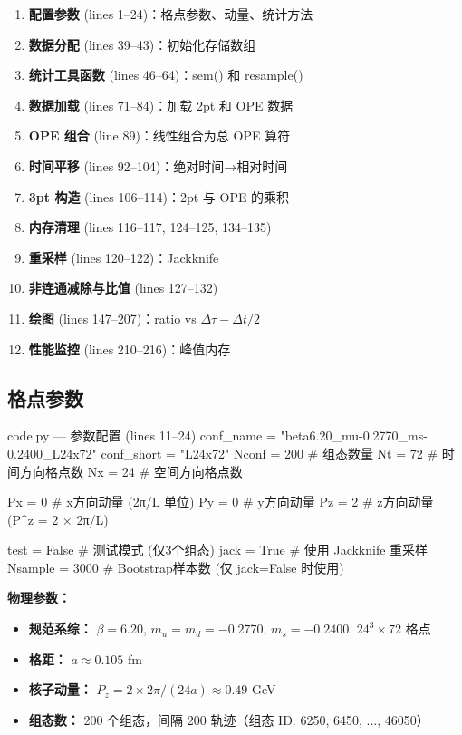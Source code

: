 \documentclass[12pt,a4paper]{ctexart}
\begin{document}
\begin{enumerate}
    \item \textbf{配置参数} (lines 1--24)：格点参数、动量、统计方法
    \item \textbf{数据分配} (lines 39--43)：初始化存储数组
    \item \textbf{统计工具函数} (lines 46--64)：sem() 和 resample()
    \item \textbf{数据加载} (lines 71--84)：加载 2pt 和 OPE 数据
    \item \textbf{OPE 组合} (line 89)：线性组合为总 OPE 算符
    \item \textbf{时间平移} (lines 92--104)：绝对时间→相对时间
    \item \textbf{3pt 构造} (lines 106--114)：2pt 与 OPE 的乘积
    \item \textbf{内存清理} (lines 116--117, 124--125, 134--135)
    \item \textbf{重采样} (lines 120--122)：Jackknife
    \item \textbf{非连通减除与比值} (lines 127--132)
    \item \textbf{绘图} (lines 147--207)：ratio vs $\Delta\tau - \Delta t/2$
    \item \textbf{性能监控} (lines 210--216)：峰值内存
\end{enumerate}

\subsection{格点参数}

\begin{codeblock}{code.py --- 参数配置 (lines 11--24)}
conf_name = "beta6.20_mu-0.2770_ms-0.2400_L24x72"
conf_short = "L24x72"
Nconf = 200    # 组态数量
Nt = 72        # 时间方向格点数
Nx = 24        # 空间方向格点数

Px = 0         # x方向动量 (2π/L 单位)
Py = 0         # y方向动量
Pz = 2         # z方向动量 (P^z = 2 × 2π/L)

test = False   # 测试模式 (仅3个组态)
jack = True    # 使用 Jackknife 重采样
Nsample = 3000 # Bootstrap样本数 (仅 jack=False 时使用)
\end{codeblock}

\textbf{物理参数：}
\begin{itemize}
    \item \textbf{规范系综：} $\beta = 6.20$, $m_u = m_d = -0.2770$, $m_s = -0.2400$,
        $24^3 \times 72$ 格点
    \item \textbf{格距：} $a \approx 0.105$ fm
    \item \textbf{核子动量：} $P_z = 2 \times 2\pi/(24a) \approx 0.49$ GeV
    \item \textbf{组态数：} 200 个组态，间隔 200 轨迹（组态 ID: 6250, 6450, ..., 46050）
\end{itemize}
\end{document}
